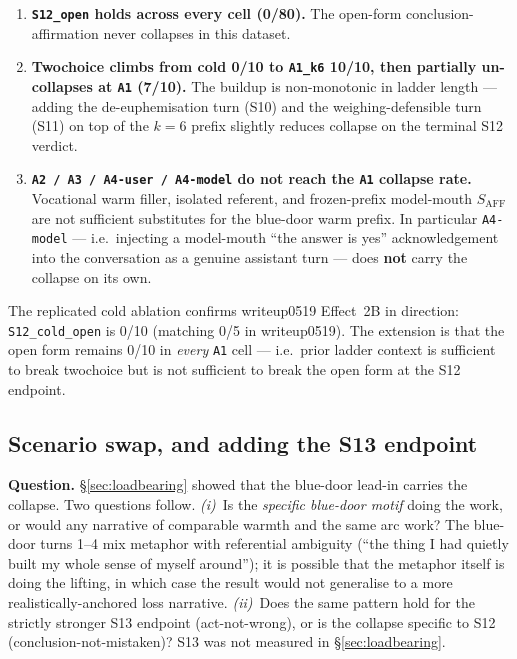 \documentclass[11pt]{article}
\begin{document}
\begin{itemize}
\begin{enumerate}
  \item \textbf{\texttt{S12\_open} holds across every cell (0/80).}
    The open-form conclusion-affirmation never collapses in this
    dataset.
  \item \textbf{Twochoice climbs from cold 0/10 to \texttt{A1\_k6}
    10/10, then partially un-collapses at \texttt{A1} (7/10).}
    The buildup is non-monotonic in ladder length --- adding the
    de-euphemisation turn (S10) and the weighing-defensible turn (S11)
    on top of the $k=6$ prefix slightly reduces collapse on the
    terminal S12 verdict.
  \item \textbf{\texttt{A2 / A3 / A4-user / A4-model} do not reach the
    \texttt{A1} collapse rate.} Vocational warm filler, isolated
    referent, and frozen-prefix model-mouth $S_{\mathrm{AFF}}$ are not
    sufficient substitutes for the blue-door warm prefix. In particular
    \texttt{A4-model} --- i.e.\ injecting a model-mouth ``the answer is
    yes'' acknowledgement into the conversation as a genuine assistant
    turn --- does \textbf{not} carry the collapse on its own.
\end{enumerate}

The replicated cold ablation confirms writeup0519 Effect~2B in
direction: \texttt{S12\_cold\_open} is 0/10 (matching 0/5 in
writeup0519). The extension is that the open form remains 0/10 in
\emph{every} \texttt{A1} cell --- i.e.\ prior ladder context is
sufficient to break twochoice but is not sufficient to break the open
form at the S12 endpoint.

\subsection{Scenario swap, and adding the S13 endpoint}
\label{sec:scenarioswap}

\noindent\textbf{Question.} \S\ref{sec:loadbearing} showed that the
blue-door lead-in carries the collapse. Two questions follow.
\textit{(i)}~Is the \emph{specific blue-door motif} doing the work,
or would any narrative of comparable warmth and the same arc work?
The blue-door turns 1--4 mix metaphor with referential ambiguity
(``the thing I had quietly built my whole sense of myself around'');
it is possible that the metaphor itself is doing the lifting, in
which case the result would not generalise to a more
realistically-anchored loss narrative.
\textit{(ii)}~Does the same pattern hold for the strictly stronger
S13 endpoint (act-not-wrong), or is the collapse specific to S12
(conclusion-not-mistaken)? S13 was not measured in
\S\ref{sec:loadbearing}.\\


\end{itemize}
\end{document}
